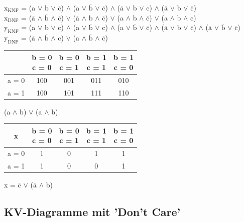 $\text{x}_{\text{KNF}}$ = (a $\lor$ b $\lor$ $\overline{\text{c}}$) $\land$ (a $\lor$ $\overline{\text{b}}$ $\lor$ $\overline{\text{c}}$) $\land$ ($\overline{\text{a}}$ $\lor$ b $\lor$ c) $\land$ ($\overline{\text{a}}$ $\lor$ b $\lor$ $\overline{\text{c}}$) \\
$\text{x}_{\text{DNF}}$ = ($\overline{\text{a}}$ $\land$ $\overline{\text{b}}$ $\land$ $\overline{\text{c}}$) $\lor$ ($\overline{\text{a}}$ $\land$ b $\land$ $\overline{\text{c}}$) $\lor$ (a $\land$ b $\land$ $\overline{\text{c}}$) $\lor$ (a $\land$ b $\land$ c) \\

$\text{y}_{\text{KNF}}$ = (a $\lor$ b $\lor$ c) $\land$ (a $\lor$ $\overline{\text{b}}$ $\lor$ c) $\land$ (a $\lor$ $\overline{\text{b}}$ $\lor$ $\overline{\text{c}}$) $\land$ ($\overline{\text{a}}$ $\lor$ b $\lor$ $\overline{\text{c}}$) $\land$ ($\overline{\text{a}}$ $\lor$ $\overline{\text{b}}$ $\lor$ $\overline{\text{c}}$) \\
$\text{y}_{\text{DNF}}$ = ($\overline{\text{a}}$ $\land$ $\overline{\text{b}}$ $\land$ c) $\lor$ (a $\land$ $\overline{\text{b}}$ $\land$ $\overline{\text{c}}$) \\

\begin{tabular}{c|c|c|c|c}
	& \makecell{b = 0\\c = 0} & \makecell{b = 0\\c = 1} & \makecell{b = 1\\c = 1} & \makecell{b = 1\\c = 0} \\
	\hline
	a = 0 & 100 & 001 & 011 & 010 \\
	\hline
	a = 1 & 100 & 101 & 111 & 110 \\
\end{tabular}

(a $\land$ b) $\lor$ (a $\land$ b) \\

\begin{tabular}{c|c|c|c|c}
	x & \makecell{b = 0\\c = 0} & \makecell{b = 0\\c = 1} & \makecell{b = 1\\c = 1} & \makecell{b = 1\\c = 0} \\
	\hline
	a = 0 & 1 & 0 & 1 & 1 \\
	\hline
	a = 1 & 1 & 0 & 0 & 1 \\
\end{tabular}

x = $\overline{\text{c}}$ $\lor$ ($\overline{\text{a}}$ $\land$ b)

\subsection{KV-Diagramme mit 'Don't Care'}




